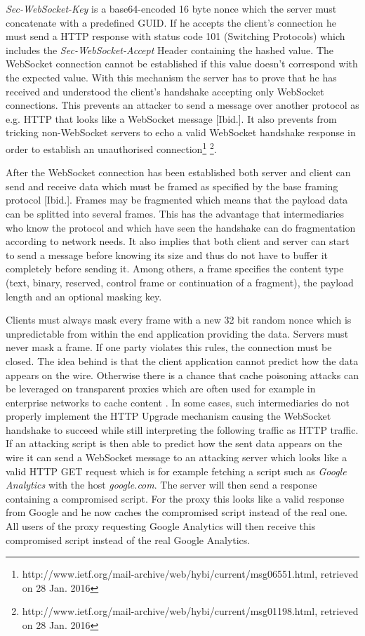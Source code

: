 \textit{Sec-WebSocket-Key} is a base64-encoded 16 byte nonce which the server must concatenate with a predefined GUID. If he accepts the client's connection he must send a HTTP response with status code 101 (Switching Protocols) which includes the \textit{Sec-WebSocket-Accept} Header containing the hashed value. The WebSocket connection cannot be established if this value doesn't correspond with the expected value. With this mechanism the server has to prove that he has received and understood the client's handshake accepting only WebSocket connections. This prevents an attacker to send a message over another protocol as e.g. HTTP that looks like a WebSocket message [Ibid.]. It also prevents from tricking non-WebSocket servers to echo a valid WebSocket handshake response in order to establish an unauthorised connection\footnote{http://www.ietf.org/mail-archive/web/hybi/current/msg06551.html, retrieved on 28 Jan. 2016} \footnote{http://www.ietf.org/mail-archive/web/hybi/current/msg01198.html, retrieved on 28 Jan. 2016}.

After the WebSocket connection has been established both server and client can send and receive data which must be framed as specified by the base framing protocol [Ibid.]. Frames may be fragmented which means that the payload data can be splitted into several frames. This has the advantage that intermediaries who know the protocol and which have seen the handshake can do fragmentation according to network needs. It also implies that both client and server can start to send a message before knowing its size and thus do not have to buffer it completely before sending it. Among others, a frame specifies the content type (text, binary, reserved, control frame or continuation of a fragment), the payload length and an optional masking key. 

Clients must always mask every frame with a new 32 bit random nonce which is unpredictable from within the end application providing the data. Servers must never mask a frame. If one party violates this rules, the connection must be closed. The idea behind is that the client application cannot predict how the data appears on the wire. Otherwise there is a chance that cache poisoning attacks can be leveraged on transparent proxies which are often used for example in enterprise networks to cache content \cite{hack}. In some cases, such intermediaries do not properly implement the HTTP Upgrade mechanism causing the WebSocket handshake to succeed while still interpreting the following traffic as HTTP traffic. If an attacking script is then able to predict how the sent data appears on the wire it can send a WebSocket message to an attacking server which looks like a valid HTTP GET request which is for example fetching a script such as \textit{Google Analytics} with the host \textit{google.com}. The server will then send a response containing a compromised script. For the proxy this looks like a valid response from Google and he now caches the compromised script instead of the real one. All users of the proxy requesting Google Analytics will then receive this compromised script instead of the real Google Analytics.


